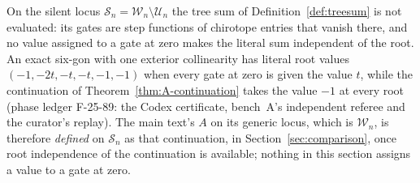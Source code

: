 \begin{remark}\label{rem:silent-amplitude}
On the silent locus $\mathcal S_n=\mathcal W_n\setminus\mathcal U_n$ the
tree sum of Definition~\ref{def:treesum} is not evaluated: its gates are
step functions of chirotope entries that vanish there, and no value
assigned to a gate at zero makes the literal sum independent of the root.
An exact six-gon with one exterior collinearity has literal root values
$(-1,-2t,-t,-t,-1,-1)$ when every gate at zero is given the value $t$,
while the continuation of Theorem~\ref{thm:A-continuation} takes the value
$-1$ at every root (phase ledger F-25-89: the Codex certificate, bench~A's
independent referee and the curator's replay). The main text's $A$ on its
generic locus, which is $\mathcal W_n$, is therefore \emph{defined} on
$\mathcal S_n$ as that continuation, in Section~\ref{sec:comparison}, once
root independence of the continuation is available; nothing in this
section assigns a value to a gate at zero.
\end{remark}


